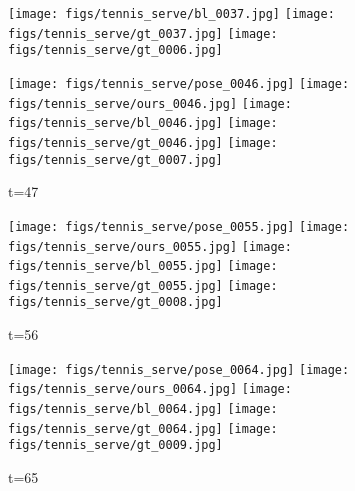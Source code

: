 \documentclass{article}
\begin{document}
\begin{figure*}[thbp]
\begin{subfigure}{0.12\linewidth}
  		\texttt{[image: figs/tennis\_serve/bl\_0037.jpg]}
  		\texttt{[image: figs/tennis\_serve/gt\_0037.jpg]}
  		\texttt{[image: figs/tennis\_serve/gt\_0006.jpg]}
	\end{subfigure}
	\begin{subfigure}{0.12\linewidth}
        \caption*{t=47}
        \vspace{-7pt}
	    \texttt{[image: figs/tennis\_serve/pose\_0046.jpg]} 
  		\texttt{[image: figs/tennis\_serve/ours\_0046.jpg]}
  		\texttt{[image: figs/tennis\_serve/bl\_0046.jpg]}
  		\texttt{[image: figs/tennis\_serve/gt\_0046.jpg]}
  		\texttt{[image: figs/tennis\_serve/gt\_0007.jpg]}
	\end{subfigure}
	\begin{subfigure}{0.12\linewidth}
        \caption*{t=56}
        \vspace{-7pt}
	    \texttt{[image: figs/tennis\_serve/pose\_0055.jpg]} 
  		\texttt{[image: figs/tennis\_serve/ours\_0055.jpg]}
  		\texttt{[image: figs/tennis\_serve/bl\_0055.jpg]}
  		\texttt{[image: figs/tennis\_serve/gt\_0055.jpg]}
  		\texttt{[image: figs/tennis\_serve/gt\_0008.jpg]}
	\end{subfigure}
	\begin{subfigure}{0.12\linewidth}
        \caption*{t=65}
        \vspace{-7pt}
	    \texttt{[image: figs/tennis\_serve/pose\_0064.jpg]} 
  		\texttt{[image: figs/tennis\_serve/ours\_0064.jpg]}
  		\texttt{[image: figs/tennis\_serve/bl\_0064.jpg]}
  		\texttt{[image: figs/tennis\_serve/gt\_0064.jpg]}
  		\texttt{[image: figs/tennis\_serve/gt\_0009.jpg]}
	\end{subfigure}
    \vspace{.1cm}\\
    \centering


\end{figure*}
\end{document}
